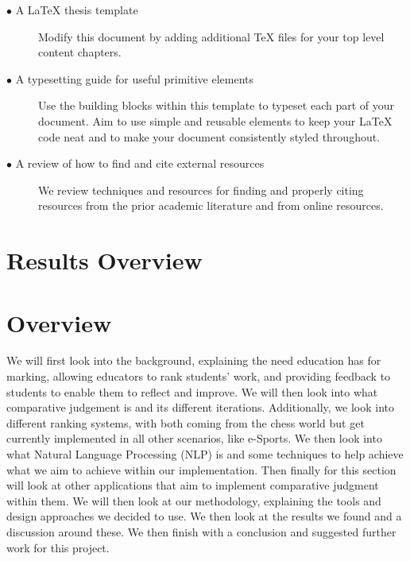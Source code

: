 		\begin{description}	

			\item[\(\bullet\) A \LaTeX{} thesis template]\hfill

			Modify this document by adding additional \TeX{} files for your top level content chapters. 

			\item[\(\bullet\) A typesetting guide for useful primitive elements]\hfill

			Use the building blocks within this template to typeset each part of your document.
			Aim to use simple and reusable elements to keep your \LaTeX{} code neat and to make your document consistently styled throughout.

			\item[\(\bullet\) A review of how to find and cite external resources]\hfill

		We review techniques and resources for finding and properly citing resources from the prior academic literature and from online resources.

		\end{description}
	
	\section{Results Overview}
	
	\section{Overview}  
	\label{sec:intro_overview} 
	 We will first look into the background, explaining the need education has for marking, allowing educators to rank students' work, and providing feedback to students to enable them to reflect and improve. We will then look into what comparative judgement is and its different iterations. Additionally, we look into different ranking systems, with both coming from the chess world but get currently implemented in all other scenarios, like e-Sports. We then look into what Natural Language Processing (NLP) is and some techniques to help achieve what we aim to achieve within our implementation. Then finally for this section will look at other applications that aim to implement comparative judgment within them. We will then look at our methodology, explaining the tools and design approaches we decided to use. We then look at the results we found and a discussion around these. We then finish with a conclusion and suggested further work for this project.
